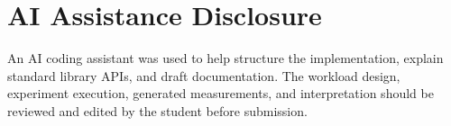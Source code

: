 \documentclass[11pt,letterpaper]{article}
\begin{document}
\section*{AI Assistance Disclosure}
An AI coding assistant was used to help structure the implementation, explain standard library APIs, and draft documentation. The workload design, experiment execution, generated measurements, and interpretation should be reviewed and edited by the student before submission.
\end{document}
